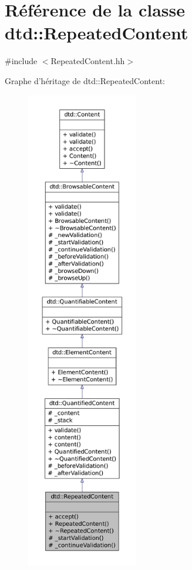 \hypertarget{classdtd_1_1_repeated_content}{
\section{Référence de la classe dtd::RepeatedContent}
\label{classdtd_1_1_repeated_content}
}


{\ttfamily \#include $<$RepeatedContent.hh$>$}



Graphe d'héritage de dtd::RepeatedContent:\nopagebreak
\begin{figure}[H]
\begin{center}
\leavevmode
\includegraphics[height=600pt]{classdtd_1_1_repeated_content__inherit__graph}
\end{center}
\end{figure}


